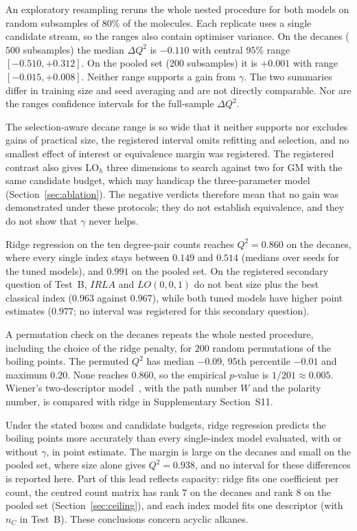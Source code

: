 \documentclass[a5paper, 10pt]{article}
\theoremstyle{plain}
\theoremstyle{remark}
\theoremstyle{definition}
\begin{document}
An exploratory resampling reruns the whole nested
procedure for both models on random subsamples of $80\%$ of the
molecules. Each replicate uses a single candidate stream, so the ranges
also contain optimiser variance. On the decanes ($500$ subsamples) the median $\Delta Q^2$ is
$-0.110$ with central $95\%$ range $[-0.510, +0.312]$. On the pooled set
($200$ subsamples) it is $+0.001$ with range $[-0.015, +0.008]$.
Neither range supports a gain from $\gamma$. The two summaries differ in
training size and seed averaging and are not directly comparable. Nor are the ranges confidence intervals for the full-sample $\Delta Q^2$.

The selection-aware decane
range is so wide that it neither supports nor excludes gains of
practical size, the registered interval omits refitting and selection,
and no smallest effect of interest or equivalence margin was
registered. The registered contrast also gives LO$_h$ three dimensions
to search against two for GM with the same candidate budget, which
may handicap the three-parameter model (Section~\ref{sec:ablation}). The
negative verdicts therefore mean that no gain was demonstrated under
these protocols; they do not establish equivalence, and they do not
show that $\gamma$ never helps.

Ridge
regression on the ten degree-pair counts reaches $Q^2 = 0.860$ on the
decanes, where every single index stays between $0.149$ and $0.514$
(medians over seeds for the tuned models), and
$0.991$ on the pooled set. On the registered secondary question of
Test~B, $IRLA$ and $LO(0,0,1)$ do not beat size plus the best classical
index ($0.963$ against $0.967$), while both tuned models have higher point estimates ($0.977$; no interval was registered for this secondary question).

A permutation check on the decanes repeats
the whole nested procedure, including the choice of the ridge penalty,
for $200$ random permutations of the boiling points. The permuted $Q^2$
has median $-0.09$, $95$th percentile $-0.01$ and maximum $0.20$. None reaches $0.860$, so the empirical $p$-value is $1/201 \approx 0.005$.
Wiener's two-descriptor model~\cite{Wiener1947}, with the path number $W$ and the polarity number, is compared with ridge in Supplementary Section~S11.

Under the stated boxes and candidate budgets, ridge regression predicts the boiling points more accurately than every single-index
model evaluated, with or without $\gamma$, in point estimate. The margin is large on the decanes and small on the pooled set, where size alone gives $Q^2 = 0.938$, and no interval for these differences is reported here. Part of this lead
reflects capacity: ridge fits one coefficient per count, the centred count
matrix has rank $7$ on the decanes and rank $8$ on the pooled set
(Section~\ref{sec:ceiling}), and each index model fits one descriptor
(with $n_C$ in Test~B). These conclusions concern acyclic alkanes.
\end{document}
